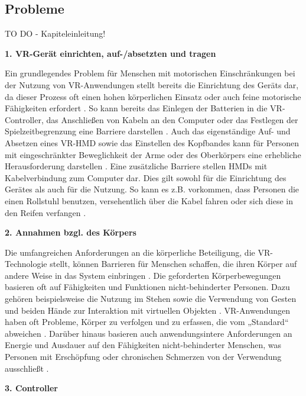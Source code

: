 \subsection{Probleme}

TO DO - Kapiteleinleitung!

{\normalfont \bfseries 1. VR-Gerät einrichten, auf-/absetzten und tragen}  

Ein grundlegendes Problem für Menschen mit motorischen Einschränkungen bei der Nutzung von VR-Anwendungen stellt bereits die Einrichtung des Geräts dar, da dieser Prozess oft einen hohen körperlichen Einsatz oder auch feine motorische Fähigkeiten erfordert \citep{gerling_critical_2021}. So kann bereits das Einlegen der Batterien in die VR-Controller, das Anschließen von Kabeln an den Computer oder das Festlegen der Spielzeitbegrenzung eine Barriere darstellen \citep{mott_i_2020}. Auch das eigenständige Auf- und Absetzen eines VR-HMD sowie das Einstellen des Kopfbandes kann für Personen mit eingeschränkter Beweglichkeit der Arme oder des Oberkörpers eine erhebliche Herausforderung darstellen \citep{mott_i_2020}. 
Eine zusätzliche Barriere stellen HMDs mit Kabelverbindung zum Computer dar. Dies gilt sowohl für die Einrichtung des Gerätes als auch für die Nutzung. So kann es z.B. vorkommen, dass Personen die einen Rollstuhl benutzen, versehentlich über die Kabel fahren oder sich diese in den Reifen verfangen \citep{mott_i_2020, wong_survey_2017}. 

{\normalfont \bfseries 2. Annahmen bzgl. des Körpers} 
 
Die umfangreichen Anforderungen an die körperliche Beteiligung, die VR-Technologie stellt, können Barrieren für Menschen schaffen, die ihren Körper auf andere Weise in das System einbringen \citep{gerling_critical_2021}. Die geforderten Körperbewegungen basieren oft auf Fähigkeiten und Funktionen nicht-behinderter Personen. Dazu gehören beispielsweise die Nutzung im Stehen sowie die Verwendung von Gesten und beiden Hände zur Interaktion mit virtuellen Objekten \citep{wong_survey_2017}. VR-Anwendungen haben oft Probleme, Körper zu verfolgen und zu erfassen, die vom „Standard“ abweichen \citep{wong_survey_2017}. Darüber hinaus basieren auch anwendungsintere Anforderungen an Energie und Ausdauer auf den Fähigkeiten nicht-behinderter Menschen, was Personen mit Erschöpfung oder chronischen Schmerzen von der Verwendung ausschließt \citep{wong_survey_2017}. 

{\normalfont \bfseries 3. Controller } 

